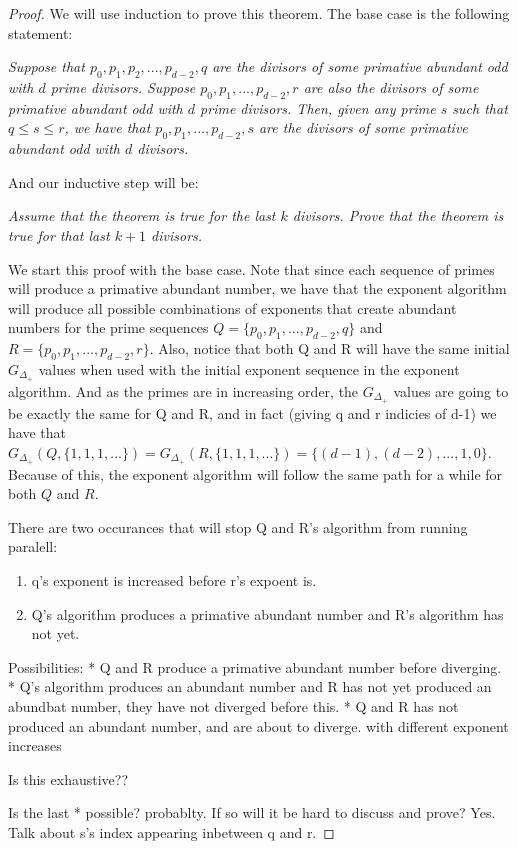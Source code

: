\documentclass[../paper.tex]{subfiles}
\begin{document}
\begin{proof}
  We will use induction to prove this theorem. The base case is
the following statement:

  \textit{Suppose that $p_0, p_1, p_2, ..., 
p_{d-2}, q$ are the divisors of some primative abundant
odd with $d$ prime divisors. Suppose $p_0, p_1, ..., p_{d-2},r$ 
are also the divisors of some primative abundant odd
with $d$ prime divisors. Then, given any prime $s$ such that $q \leq s 
\leq r$, we have that $p_0, p_1,..., p_{d-2}, s$ are the 
divisors of some primative abundant odd with $d$ divisors.}

And our inductive step will be:

  \textit{Assume that the theorem is true for the last $k$
divisors. Prove that the theorem is true for that last $k + 1$
divisors.}

We start this proof with the base case. Note that since each sequence
of primes will produce a primative abundant number, we have that
the exponent algorithm will produce all possible combinations of
exponents that create abundant numbers for the prime sequences $Q = 
\{p_0, p_1, ..., p_{d-2}, q\}$ and $R = \{p_0, p_1, ..., p_{d-2},
r\}$. Also, notice that both Q and R will have the same initial
$G_{\Delta_+}$ values when used with the initial exponent sequence
in the exponent algorithm. And as the primes are in increasing
order, the $G_{\Delta_+}$ values are going to be exactly the same
for Q and R, and in fact (giving q and r indicies of d-1) we have
that $G_{\Delta_+}(Q, \{1,1,1,...\}) = G_{\Delta_+}(R,
\{1,1,1,...\}) = \{(d-1), (d-2), ..., 1, 0\}$. Because of this,
the exponent algorithm will follow the same path for a while for
both $Q$ and $R$.


There are two occurances that will stop Q and R's algorithm from
running paralell:
\begin{enumerate}
  \item q's exponent is increased before r's expoent is.
  \item Q's algorithm produces a primative abundant number and R's
algorithm has not yet.
\end{enumerate}

Possibilities:
  * Q and R produce a primative abundant number before diverging.
  * Q's algorithm produces an abundant number and R has not yet produced an
abundbat number, they have not diverged before this.
  * Q and R has not produced an abundant number, and are about to
diverge. with different exponent increases

Is this exhaustive??

Is the last * possible? probablty. If so will it be hard to
discuss and prove? Yes. Talk about s's index appearing inbetween
q and r.


\end{proof}
\end{document}

